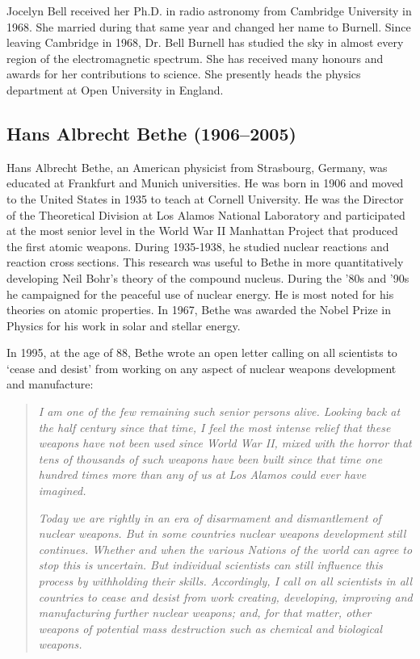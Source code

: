 Jocelyn Bell received her Ph.D. in radio astronomy from Cambridge University in 1968. She married during that same year and changed her name to Burnell. Since leaving Cambridge in 1968, Dr. Bell Burnell has studied the sky in almost every region of the electromagnetic spectrum. She has received many honours and awards for her contributions to science. She presently heads the physics department at Open University in England.

\subsection[Hans \scshape{Bethe}]{Hans Albrecht Bethe (1906--2005)}\label{bio:bethe}
Hans Albrecht Bethe, an American physicist from Strasbourg, Germany, was educated at Frankfurt and Munich universities. He was born in 1906 and moved to the United States in 1935 to teach at Cornell University. He was the Director of the Theoretical Division at Los Alamos National Laboratory and participated at the most senior level in the World War II Manhattan Project that produced the first atomic weapons. During 1935-1938, he studied nuclear reactions and reaction cross sections. This research was useful to Bethe in more quantitatively developing Neil Bohr's theory of the compound nucleus. During the '80s and '90s he campaigned for the peaceful use of nuclear energy. He is most noted for his theories on atomic properties. In 1967, Bethe was awarded the Nobel Prize in Physics for his work in solar and stellar energy.

In 1995, at the age of 88, Bethe wrote an open letter calling on all scientists to ‘cease and desist’ from working on any aspect of nuclear weapons development and manufacture:
\begin{quote}
\textit{I am one of the few remaining such senior persons alive. Looking back at the half century since that time, I feel the most intense relief that these weapons have not been used since World War II, mixed with the horror that tens of thousands of such weapons have been built since that time one hundred times more than any of us at Los Alamos could ever have imagined.}

\textit{Today we are rightly in an era of disarmament and dismantlement of nuclear weapons. But in some countries nuclear weapons development still continues. Whether and when the various Nations of the world can agree to stop this is uncertain. But individual scientists can still influence this process by withholding their skills. Accordingly, I call on all scientists in all countries to cease and desist from work creating, developing, improving and manufacturing further nuclear weapons; and, for that matter, other weapons of potential mass destruction such as chemical and biological weapons.}
\end{quote}

